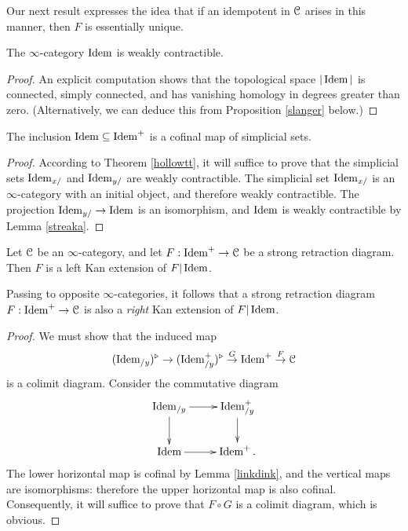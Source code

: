 Our next result expresses the idea that if an idempotent in $\operatorname{\mathcal{C}}$ arises in this manner, then $F$ is essentially unique.

\begin{lemma}\label{streaka}
The $\infty$-category $\operatorname{Idem}$ is weakly contractible.
\end{lemma}

\begin{proof}
An explicit computation shows that the topological space $|\operatorname{Idem}|$ is connected, simply connected, and has vanishing homology in degrees greater than zero. (Alternatively, we can deduce this from Proposition \ref{slanger} below.) 
\end{proof}

\begin{lemma}\label{linkdink}
The inclusion $\operatorname{Idem} \subseteq \operatorname{Idem}^{+}$ is a cofinal map of simplicial sets.
\end{lemma}

\begin{proof}
According to Theorem \ref{hollowtt}, it will suffice to prove that the simplicial sets
$\operatorname{Idem}_{x/}$ and $\operatorname{Idem}_{y/}$ are weakly contractible. The simplicial set $\operatorname{Idem}_{x/}$ is an $\infty$-category with an initial object, and therefore weakly contractible. The projection
$\operatorname{Idem}_{y/} \rightarrow \operatorname{Idem}$ is an isomorphism, and $\operatorname{Idem}$ is weakly contractible by Lemma \ref{streaka}.
\end{proof}

\begin{proposition}\label{autokan}
Let $\operatorname{\mathcal{C}}$ be an $\infty$-category, and let $F: \operatorname{Idem}^{+} \rightarrow \operatorname{\mathcal{C}}$ be a strong retraction diagram. Then $F$ is a left Kan extension of $F| \operatorname{Idem}$.
\end{proposition}

\begin{remark}
Passing to opposite $\infty$-categories, it follows that a strong retraction diagram $F: \operatorname{Idem}^{+} \rightarrow \operatorname{\mathcal{C}}$ is also a {\em right} Kan extension of $F|\operatorname{Idem}$.
\end{remark}

\begin{proof}
We must show that the induced map
$$ (\operatorname{Idem}_{/y})^{\triangleright} \rightarrow (\operatorname{Idem}^{+}_{/y})^{\triangleright} \stackrel{G}{\rightarrow} \operatorname{Idem}^{+}
\stackrel{F}{\rightarrow} \operatorname{\mathcal{C}}$$
is a colimit diagram. Consider the commutative diagram
$$ \xymatrix{ \Idem_{/y} \ar[r] \ar[d] & \Idem^{+}_{/y} \ar[d] \\
\Idem \ar[r] & \Idem^{+}. }$$
The lower horizontal map is cofinal by Lemma \ref{linkdink}, and the vertical maps are isomorphisms: therefore the upper horizontal map is also cofinal. Consequently, it will suffice to prove that $F \circ G$ is a colimit diagram, which is obvious.
\end{proof}

